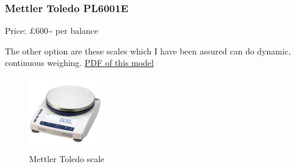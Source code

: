\documentclass[11pt]{article}
\begin{document}
\begin{enumerate}
\subsubsection{Mettler Toledo PL6001E}
\label{sec-2-2-2}

Price: £600\textasciitilde{} per balance

The other option are these scales which I have been assured can do dynamic, continuous weighing. 
\href{http://uk.mt.com/dam/P5/labtec/03_Precision_Balances/12_PL-E/03_Documentation/02_Datasheet/DS_PL-E_Precision_EN.pdf}{PDF of this model }

\begin{figure}[htb]
\centering
\includegraphics[width=120px]{./images/scale.jpg}
\caption{\label{fig:MT-Scale}Mettler Toledo scale}
\end{figure}
\end{enumerate}
\end{document}
